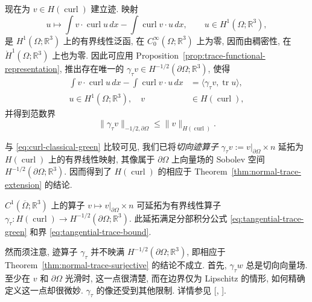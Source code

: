 {现在为 $v\in H(\operatorname{curl})$ 建立迹. 映射}
\[
u\mapsto\int v\cdot\operatorname{curl}u\,dx-\int\operatorname{curl}v\cdot u\,dx,\qquad u\in H^1(\Omega;\mathbb R^3),
\]
{是 $H^1(\Omega;\mathbb R^3)$ 上的有界线性泛函, 在 $C_0^\infty(\Omega;\mathbb R^3)$ 上为零, 因而由稠密性, 在 $\mathring H^1(\Omega;\mathbb R^3)$ 上也为零. 因此可应用 Proposition~\ref{prop:trace-functional-representation}, 推出存在唯一的 $\gamma_\tau v\in H^{-1/2}(\partial\Omega;\mathbb R^3)$, 使得}
\begin{equation}\label{eq:tangential-trace-green}
\begin{aligned}
\int v\cdot\operatorname{curl}u\,dx-\int\operatorname{curl}v\cdot u\,dx&=\langle\gamma_\tau v,\operatorname{tr}u\rangle,\\
u\in H^1(\Omega;\mathbb R^3),\quad v&\in H(\operatorname{curl}),
\end{aligned}
\end{equation}
{并得到范数界}
\begin{equation}\label{eq:tangential-trace-bound}
\|\gamma_\tau v\|_{-1/2,\partial\Omega}\leq\|v\|_{H(\operatorname{curl})}.
\end{equation}

{与 \eqref{eq:curl-classical-green} 比较可见, 我们已将\emph{切向迹算子} $\gamma_\tau v:=v|_{\partial\Omega}\times n$ 延拓为 $H(\operatorname{curl})$ 上的有界线性映射, 其像属于 $\partial\Omega$ 上向量场的 Sobolev 空间 $H^{-1/2}(\partial\Omega;\mathbb R^3)$. 因而得到了 $H(\operatorname{curl})$ 的相应于 Theorem~\ref{thm:normal-trace-extension} 的结论.}


\begin{Theorem}\label{thm:tangential-trace-extension}
{$C^1(\overline\Omega;\mathbb R^3)$ 上的算子 $v\mapsto v|_{\partial\Omega}\times n$ 可延拓为有界线性算子 $\gamma_\tau:H(\operatorname{curl})\to H^{-1/2}(\partial\Omega;\mathbb R^3)$. 此延拓满足分部积分公式 \eqref{eq:tangential-trace-green} 和界 \eqref{eq:tangential-trace-bound}.}
\end{Theorem}

{然而须注意, 迹算子 $\gamma_\tau$ 并不映满 $H^{-1/2}(\partial\Omega;\mathbb R^3)$, 即相应于 Theorem~\ref{thm:normal-trace-surjective} 的结论不成立. 首先, $\gamma_\tau w$ 总是切向向量场. 至少在 $v$ 和 $\partial\Omega$ 光滑时, 这一点很清楚, 而在边界仅为 Lipschitz 的情形, 如何精确定义这一点却很微妙. $\gamma_\tau$ 的像还受到其他限制. 详情参见 [, ].}

